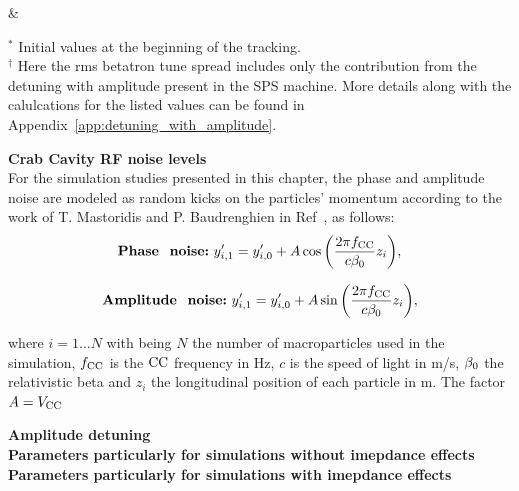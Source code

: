 \begin{table}[!hbt]
\begin{minipage}{\textwidth}
\begin{centering}
\begin{tabu}
        & \\
      \bottomrule
	\end{tabu}
   \label{tab:sps_pyheadtail_emit_growth_parameters}
   \end{centering} \footnotesize{$^\ast$ Initial values at the beginning of the tracking.\\$^\dagger$ Here the rms betatron tune spread includes only the contribution from the detuning with amplitude present in the SPS machine. More details along with the calulcations for the listed values can be found in Appendix~\ref{app:detuning_with_amplitude}.}
   \end{minipage}
\end{table}

\normalsize{\textbf{Crab Cavity RF noise levels}}\\
For the simulation studies presented in this chapter, the phase and amplitude noise are modeled as random kicks on the particles' momentum according to the work of T. Mastoridis and P. Baudrenghien in Ref~\cite{PhysRevSTAB.18.101001}, as follows:
\begin{equation}
    \mathrm{\textbf{Phase \ noise:}} \ y^\prime_{i,1} = y^\prime_{i, 0} + A \cos{\left ( \frac{2\pi \fCC}{c \betarel}z_i \right )},
\end{equation}

\begin{equation}
    \mathrm{\textbf{Amplitude \ noise:}} \ y^\prime_{i, 1} = y^\prime_{i, 0} + A \sin{\left ( \frac{2\pi \fCC}{c \betarel}z_i \right )},
\end{equation}

where $i=1...N$ with being $N$ the number of macroparticles used in the simulation,  ${f_\mathrm{CC}}$ is the ${\mathrm{CC}}$ frequency in Hz, $c$ is the speed of light in m/s, ${\beta_0}$ the relativistic beta and $z_i$ the longitudinal position of each particle in m. The factor $A={V_\mathrm{CC}}$




\normalsize{\textbf{Amplitude detuning}}\\
\normalsize{\textbf{Parameters particularly for simulations without imepdance effects}}\\
\normalsize{\textbf{Parameters particularly for simulations with imepdance effects}}\\


